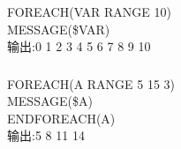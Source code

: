 \documentclass{beamer}
\begin{document}
\begin{CJK}{UTF8}{gkai}
  \begin{frame}\frametitle{}
    FOREACH(VAR RANGE 10)\\
    MESSAGE(\${VAR})\\
    输出:0 1 2 3 4 5 6 7 8 9 10
  \end{frame}

  \begin{frame}\frametitle{}
    FOREACH(A RANGE 5 15 3)\\
    MESSAGE(\${A})\\
    ENDFOREACH(A)\\
    输出:5 8 11 14
  \end{frame}

\end{CJK}
\end{document}
